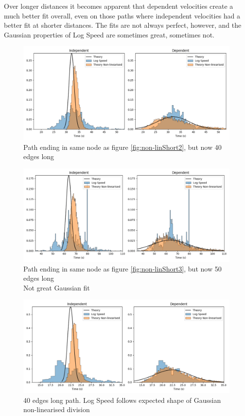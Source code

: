 \documentclass{article}
\begin{document}
				Over longer distances it becomes apparent that dependent velocities create a much better fit overall, even on those paths where independent velocities had a better fit at shorter distances. The fits are not always perfect, however, and the Gaussian properties of Log Speed are sometimes great, sometimes not.

				\begin{figure}[H]
					\includegraphics[scale=0.5]{non-lin10-40B.png}
					\caption{Path ending in same node as figure \ref{fig:non-linShort2}, but now 40 edges long}
					\label{fig:non-linLong1}
				\end{figure}
				\begin{figure}[H]
					\includegraphics[scale=0.5]{non-lin8-50A.png}
					\caption{Path ending in same node as figure \ref{fig:non-linShort3}, but now 50 edges long\\Not great Gaussian fit}
					\label{fig:non-linLong2}
				\end{figure}
				\begin{figure}[H]
					\includegraphics[scale=0.5]{non-lin12-40A.png}
					\caption{40 edges long path. Log Speed follows expected shape of Gaussian non-linearised division}
					\label{fig:non-linLong3}
				\end{figure}
\end{document}
